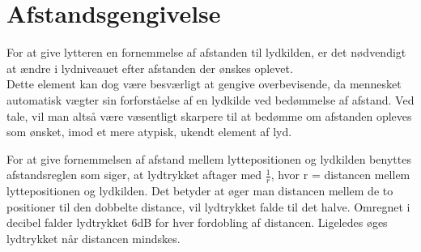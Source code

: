 \section{Afstandsgengivelse}

For at give lytteren en fornemmelse af afstanden til lydkilden, er det nødvendigt at ændre i lydniveauet efter afstanden der ønskes oplevet. \\ 
Dette element kan dog være besværligt at gengive overbevisende, da mennesket automatisk vægter sin forforståelse af en lydkilde ved bedømmelse af afstand. Ved tale, vil man altså være væsentligt skarpere til at bedømme om afstanden opleves som ønsket, imod et mere atypisk, ukendt element af lyd\cite{SpatialBook}.

For at give fornemmelsen af afstand mellem lyttepositionen og lydkilden benyttes afstandsreglen som siger, at lydtrykket aftager med $\frac{1}{r}$, hvor r = distancen mellem lyttepositionen og lydkilden. Det betyder at øger man distancen mellem de to positioner til den dobbelte distance, vil lydtrykket falde til det halve. Omregnet i decibel falder lydtrykket 6dB for hver fordobling af distancen. Ligeledes øges lydtrykket når distancen mindskes. 